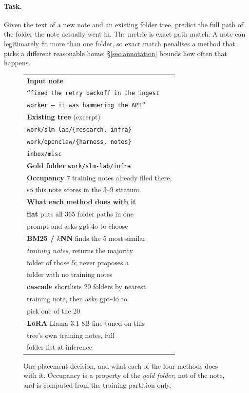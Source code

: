 \documentclass[11pt]{article}
\begin{document}
\paragraph{Task.}
Given the text of a new note and an existing folder tree, predict the full path of the folder the note actually went in.
The metric is exact path match.
A note can legitimately fit more than one folder, so exact match penalises a method that picks a different reasonable home; \S\ref{sec:annotation} bounds how often that happens.

\begin{figure}[t]
\centering
\small
\setlength{\tabcolsep}{4pt}
\begin{tabular}{@{}p{}@{}}
\toprule
\textbf{Input note}\\[1pt]
\texttt{\footnotesize ``fixed the retry backoff in the ingest}\\
\texttt{\footnotesize worker --- it was hammering the API''}\\[4pt]
\textbf{Existing tree} (excerpt)\\[1pt]
\texttt{\footnotesize work/slm-lab/\{research, infra\}}\\
\texttt{\footnotesize work/openclaw/\{harness, notes\}}\\
\texttt{\footnotesize inbox/misc}\\[4pt]
\textbf{Gold folder} \texttt{\footnotesize work/slm-lab/infra}\\
\textbf{Occupancy} 7 training notes already filed there,\\
so this note scores in the $3$--$9$ stratum.\\
\midrule
\textbf{What each method does with it}\\[2pt]
\textbf{flat} \hfill puts all 365 folder paths in one\\
\hfill prompt and asks gpt-4o to choose\\[2pt]
\textbf{BM25 / $k$NN} \hfill finds the 5 most similar\\
\hfill \emph{training notes}, returns the majority\\
\hfill folder of those 5; never proposes a\\
\hfill folder with no training notes\\[2pt]
\textbf{cascade} \hfill shortlists 20 folders by nearest\\
\hfill training note, then asks gpt-4o to\\
\hfill pick one of the 20\\[2pt]
\textbf{LoRA} \hfill Llama-3.1-8B fine-tuned on this\\
\hfill tree's own training notes, full\\
\hfill folder list at inference\\
\bottomrule
\end{tabular}
\caption{One placement decision, and what each of the four methods does with it. Occupancy is a property of the \emph{gold folder}, not of the note, and is computed from the training partition only.}
\label{fig:worked}
\end{figure}
\end{document}
